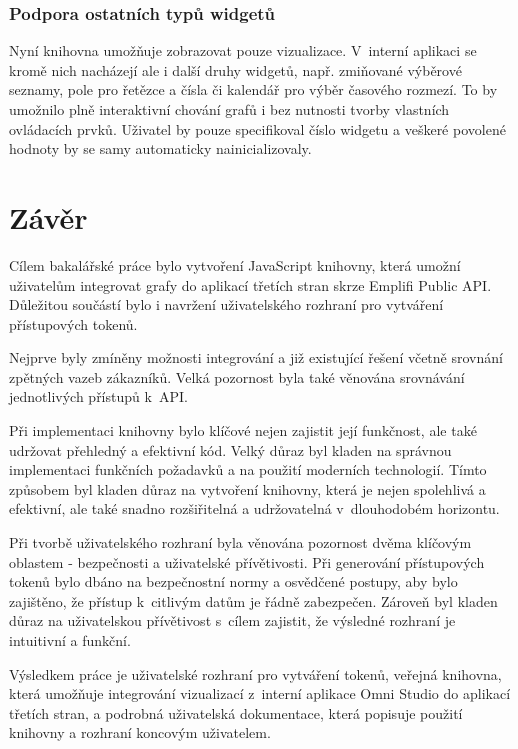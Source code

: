 \documentclass[czech, bc, kiv, he, iso690numb, viewonly]{fasthesis} %
\begin{document}
\subsection{Podpora ostatních typů widgetů}
Nyní knihovna umožňuje zobrazovat pouze vizualizace. V~interní aplikaci se kromě nich nacházejí ale i další druhy widgetů, např. zmiňované výběrové seznamy,
pole pro řetězce a čísla či kalendář pro výběr časového rozmezí. To by umožnilo plně interaktivní chování grafů i bez nutnosti tvorby vlastních ovládacích prvků.
Uživatel by pouze specifikoval číslo widgetu a veškeré povolené hodnoty by se samy automaticky nainicializovaly.


%
%
%
%
\chapter{Závěr}
Cílem bakalářské práce bylo vytvoření JavaScript knihovny, která umožní uživatelům integrovat grafy do aplikací třetích stran skrze
Emplifi Public API. Důležitou součástí bylo i navržení uživatelského rozhraní pro vytváření přístupových tokenů.

Nejprve byly zmíněny možnosti integrování a již existující řešení včetně srovnání zpětných vazeb zákazníků. Velká pozornost byla také
věnována srovnávání jednotlivých přístupů k~API.

Při implementaci knihovny bylo klíčové nejen zajistit její funkčnost, ale také udržovat přehledný a efektivní kód.
Velký důraz byl kladen na správnou implementaci funkčních požadavků a na použití moderních technologií. 
Tímto způsobem byl kladen důraz na vytvoření knihovny, která je nejen spolehlivá a efektivní, ale také snadno rozšiřitelná a udržovatelná v~dlouhodobém horizontu.

Při tvorbě uživatelského rozhraní byla věnována pozornost dvěma klíčovým oblastem - bezpečnosti a uživatelské přívětivosti. Při generování přístupových tokenů bylo dbáno na
bezpečnostní normy a osvědčené postupy, aby bylo zajištěno, že přístup k~citlivým datům je řádně zabezpečen. 
Zároveň byl kladen důraz na uživatelskou přívětivost s~cílem zajistit, že výsledné rozhraní je intuitivní a funkční.

Výsledkem práce je uživatelské rozhraní pro vytváření tokenů, veřejná knihovna, která umožňuje integrování vizualizací z~interní aplikace Omni Studio
do aplikací třetích stran, a podrobná uživatelská dokumentace, která popisuje použití knihovny a rozhraní koncovým uživatelem.
\end{document}
